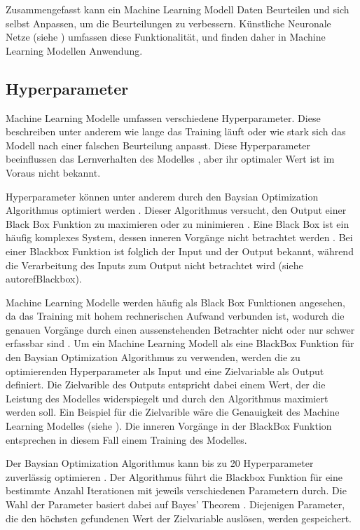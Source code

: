Zusammengefasst kann ein Machine Learning Modell Daten Beurteilen und sich
selbst Anpassen, um die Beurteilungen zu verbessern. Künstliche Neuronale Netze
(siehe ) umfassen diese Funktionalität, und finden daher in
Machine Learning Modellen Anwendung.


\subsection{Hyperparameter}\label{sub:t_ml_hyper}
Machine Learning Modelle umfassen verschiedene Hyperparameter. Diese beschreiben
unter anderem wie lange das Training läuft oder wie stark sich das Modell nach
einer falschen Beurteilung anpasst. Diese Hyperparameter beeinflussen das
Lernverhalten des Modelles \cite{nyuytiymbiy_parameters_2022}, aber ihr optimaler Wert ist im
Voraus nicht bekannt.

Hyperparameter können unter anderem durch den Baysian Optimization Algorithmus
optimiert werden
\cite{agnihotri_exploring_2020}\cite{paretos_bayesian_2021}.
Dieser Algorithmus versucht, den Output einer Black Box Funktion zu maximieren
oder zu minimieren \cite[S. 15]{garnett_bayesian_nodate}. Eine Black Box ist ein häufig komplexes
System, dessen inneren Vorgänge nicht betrachtet werden \cite{noauthor_black_2021}.
Bei einer Blackbox Funktion ist folglich der Input und der Output bekannt,
während die Verarbeitung des Inputs zum Output nicht betrachtet wird (siehe
autoref{Blackbox}). %


Machine Learning Modelle werden häufig als Black Box Funktionen angesehen, da
das Training mit hohem rechnerischen Aufwand verbunden ist, wodurch die genauen
Vorgänge durch einen aussenstehenden Betrachter nicht oder nur schwer erfassbar
sind \cite{robbins_machine_2017}. Um ein Machine Learning Modell als eine BlackBox Funktion für
den Baysian Optimization Algorithmus zu verwenden, werden die zu optimierenden
Hyperparameter als Input und eine Zielvariable als Output definiert. Die
Zielvarible des Outputs entspricht dabei einem Wert, der die Leistung des
Modelles widerspiegelt und durch den Algorithmus maximiert werden soll. Ein
Beispiel für die Zielvarible wäre die Genauigkeit des Machine Learning Modelles
(siehe ). Die inneren Vorgänge in der BlackBox Funktion
entsprechen in diesem Fall einem Training des Modelles.

Der Baysian Optimization Algorithmus kann bis zu 20 Hyperparameter zuverlässig
optimieren \cite{moriconi_high-dimensional_2020}. Der Algorithmus führt die Blackbox Funktion für eine
bestimmte Anzahl Iterationen mit jeweils verschiedenen Parametern durch. Die
Wahl der Parameter basiert dabei auf Bayes' Theorem \cite[S. 7]{garnett_bayesian_nodate}.
Diejenigen Parameter, die den höchsten gefundenen Wert der Zielvariable
auslösen, werden gespeichert.


